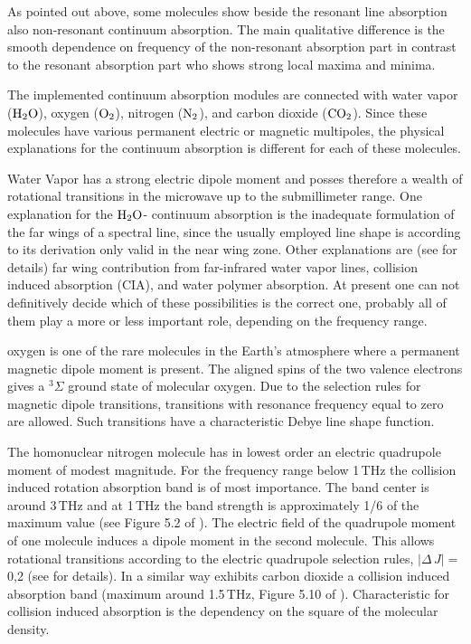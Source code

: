 
\label{levelb:ContAbs}

As pointed out above, some molecules show beside the resonant line
absorption also non-resonant continuum absorption. The main qualitative
difference is the smooth dependence on frequency of the non-resonant
absorption part in contrast to the resonant absorption part who shows 
strong local maxima and minima.

The implemented continuum absorption modules are connected with water
vapor ($\mbox{H}_2\mbox{O}$), oxygen ($\mbox{O}_2$), nitrogen ($\mbox{N}_2$), and carbon dioxide
($\mbox{CO}_2$). Since these molecules have various permanent electric or magnetic
multipoles, the physical explanations for the continuum absorption is 
different for each of these molecules.

Water Vapor has a strong electric dipole moment and posses therefore a 
wealth of rotational transitions in the microwave up to the submillimeter 
range. One explanation for the $\mbox{H}_2\mbox{O}$- continuum absorption is the inadequate 
formulation of the far wings of a spectral line, since the usually employed 
\citet{vanvleck:45} line shape is according to its derivation only valid 
in the near wing zone. Other explanations are (see \cite{pwr:93} for details) 
far wing contribution from far-infrared water vapor lines, collision induced 
absorption (CIA), and water polymer absorption. At present one can not definitively 
decide which of these possibilities is the correct one, probably all of them 
play a more or less important role, depending on the frequency range.

oxygen is one of the rare molecules in the Earth's atmosphere where a permanent 
magnetic dipole moment is present. The aligned spins of the two valence electrons 
gives a $^{3}\Sigma$ ground state of molecular oxygen. 
Due to the selection rules for magnetic dipole transitions, transitions with 
resonance frequency equal to zero are allowed. Such transitions have a characteristic 
Debye line shape function.

The homonuclear nitrogen molecule has in lowest order an electric quadrupole moment 
of modest magnitude.
For the frequency range below 1\,THz the collision induced rotation absorption 
band \cite{goodyandyung:89} is of most importance. The band center is around 3\,THz and 
at 1\,THz the band strength is approximately 1/6 of the maximum value (see 
Figure 5.2 of \cite{goodyandyung:89}). The electric field of the quadrupole 
moment of one molecule induces a dipole moment in the second molecule. This allows 
rotational transitions according to the electric quadrupole selection rules, 
$|\Delta\,J|=$0,2 (see \cite{pwr:93} for details). In a similar way exhibits 
carbon dioxide a collision induced absorption band (maximum around 1.5\,THz, 
Figure 5.10 of \cite{goodyandyung:89}). Characteristic for collision induced 
absorption is the dependency on the square of the molecular density.



